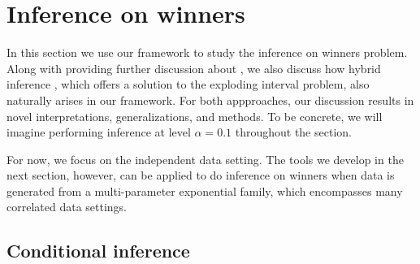 \documentclass{article}
\begin{document}
\section{Inference on winners}
\label{sec:winner}

In this section we use our framework to study the inference on winners problem. Along with providing further discussion about , we also discuss how hybrid inference \citep{Andrews2023}, which offers a solution to the exploding interval problem, also naturally arises in our framework. For both appproaches, our discussion results in novel interpretations, generalizations, and methods. To be concrete, we will imagine performing inference at level $\alpha = 0.1$ throughout the section.

For now, we focus on the independent data setting. The tools we develop in the next section, however, can be applied to do inference on winners when data is generated from a multi-parameter exponential family, which encompasses many correlated data settings. 


\subsection{Conditional inference}
\end{document}
